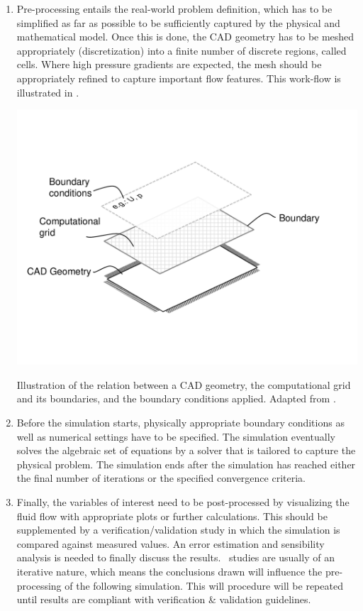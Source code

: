 \begin{enumerate}
	
\item Pre-processing entails the real-world problem definition, which has to be simplified as far as possible to be sufficiently captured by the physical and mathematical model. Once this is done, the \gls{CAD} geometry has to be meshed appropriately (discretization) into a finite number of discrete regions, called cells. Where high pressure gradients are expected, the mesh should be appropriately refined to capture important flow features. This work-flow is illustrated in  .

\begin{sidefigure}[2][htb]
	\centering
	\includegraphics[width=0.6\linewidth, trim= 0cm 1cm 1cm 0, clip]{images/CAD_boundary}
	\captionsetup{format=plain,labelsep=newline}
	\caption[Relation between \gls{CAD} geometry, computational grid and boundary conditions]{Illustration of the relation between a \gls{CAD} geometry, the computational grid and its boundaries, and the boundary conditions applied. Adapted from \citep{Maric2014}.}
	\label{fig:cadboundary}
\end{sidefigure}

\item Before the simulation starts, physically appropriate boundary conditions as well as numerical settings have to be specified. The simulation eventually solves the algebraic set of equations by a solver that is tailored to capture the physical problem. The simulation ends after the simulation has reached either the final number of iterations or the specified convergence criteria.


\item Finally, the variables of interest need to be post-processed by visualizing the fluid flow with appropriate plots or further calculations. This should be supplemented by a verification/validation study in which the simulation is compared against measured values. An error estimation and sensibility analysis is needed to finally discuss the results. \CFD\ studies are usually of an iterative nature, which means the conclusions drawn will influence the pre-processing of the following simulation. This will procedure will be repeated until results are compliant with verification \& validation guidelines.

\end{enumerate}




